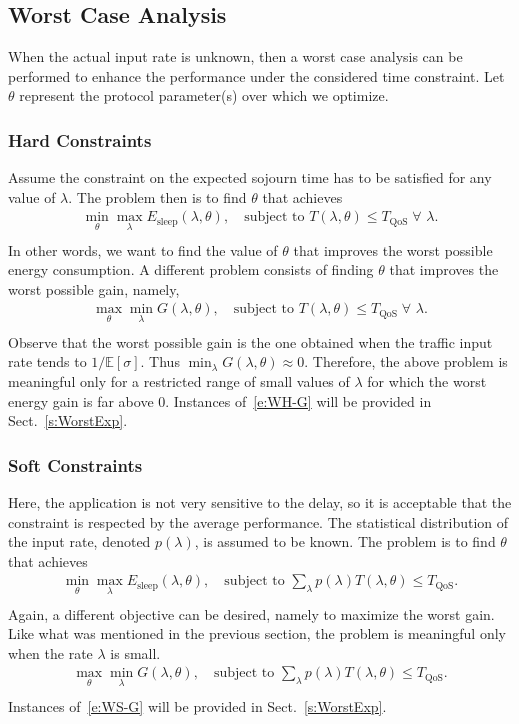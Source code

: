 \documentclass[journal]{IEEEtran}
\newcommand {\beq} {\begin{equation}}
\newcommand {\eeq} {\end{equation}}
\newcommand {\barr} {\begin{array}}
\newcommand {\earr} {\end{array}}
\def \E{{\mathbb E}}
\begin{document}
\subsection{Worst Case Analysis}
\label{s:worst}
When the actual input rate is unknown, then a worst case analysis can be performed to enhance the performance under the considered time constraint. Let $\theta$ represent the protocol parameter(s) over which we optimize.
\subsubsection*{Hard Constraints}
Assume the constraint on the expected sojourn time has to be satisfied for any value of $\lambda$. The problem then is to find $\theta$ that achieves
\beq
\label{e:WH-E}
\barr{l}
\min_\theta \max_\lambda E_{\textrm{sleep}}(\lambda,\theta), \quad
\textrm{subject to } T(\lambda,\theta) \leq T_{\textrm{QoS}} \; \forall \,\,\lambda.\\
\earr
\eeq
In other words, we want to find the value of $\theta$ that improves the worst possible energy consumption.
A different problem consists of finding $\theta$ that improves the worst possible gain, namely,
\beq
\label{e:WH-G}
\barr{l}
\max_\theta \min_\lambda G(\lambda,\theta), \quad
\textrm{subject to } T(\lambda,\theta) \leq T_{\textrm{QoS}} \; \forall \,\,\lambda.\\
\earr
\eeq
Observe that the worst possible gain is the one obtained when the traffic input rate tends to $1/\E[\sigma]$. Thus $\min_\lambda G(\lambda,\theta)\approx0$. Therefore, the above problem is meaningful only for a restricted range of small values of $\lambda$ for which the worst energy gain is far above 0. Instances of~\eqref{e:WH-G} will be provided in Sect.~\ref{s:WorstExp}.
\subsubsection*{Soft Constraints}
Here, the application is not very sensitive to the delay, so it is acceptable that the constraint is respected by the average performance. The statistical distribution of the input rate, denoted $p(\lambda)$, is assumed to be known. The problem is to find $\theta$ that achieves
\beq
\label{e:WS-E}
\barr{l}
\min_\theta \max_\lambda E_{\textrm{sleep}}(\lambda,\theta), \quad
\textrm{subject to } \sum_\lambda p(\lambda) T(\lambda,\theta) \leq T_{\textrm{QoS}} .\\
\earr
\eeq
Again, a different objective can be desired, namely to maximize the worst gain. Like what was mentioned in the previous section, the problem is meaningful only when the rate $\lambda$ is small.
\beq
\label{e:WS-G}
\barr{l}
\max_\theta \min_\lambda G(\lambda,\theta), \quad
\textrm{subject to } \sum_\lambda p(\lambda) T(\lambda,\theta) \leq T_{\textrm{QoS}} .\\
\earr
\eeq
Instances of~\eqref{e:WS-G} will be provided in Sect.~\ref{s:WorstExp}.
\end{document}
